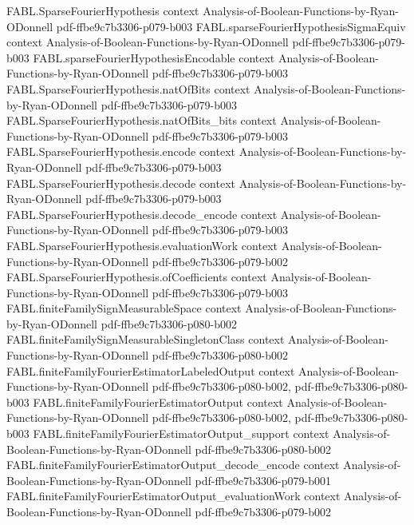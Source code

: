 \begin{theorem}
  {FABL.SparseFourierHypothesis}
  {context}
  {Analysis-of-Boolean-Functions-by-Ryan-ODonnell}
  {pdf-ffbe9c7b3306-p079-b003}
\proofstep
  {FABL.sparseFourierHypothesisSigmaEquiv}
  {context}
  {Analysis-of-Boolean-Functions-by-Ryan-ODonnell}
  {pdf-ffbe9c7b3306-p079-b003}
\proofstep
  {FABL.sparseFourierHypothesisEncodable}
  {context}
  {Analysis-of-Boolean-Functions-by-Ryan-ODonnell}
  {pdf-ffbe9c7b3306-p079-b003}
\proofstep
  {FABL.SparseFourierHypothesis.natOfBits}
  {context}
  {Analysis-of-Boolean-Functions-by-Ryan-ODonnell}
  {pdf-ffbe9c7b3306-p079-b003}
\proofstep
  {FABL.SparseFourierHypothesis.natOfBits_bits}
  {context}
  {Analysis-of-Boolean-Functions-by-Ryan-ODonnell}
  {pdf-ffbe9c7b3306-p079-b003}
\proofstep
  {FABL.SparseFourierHypothesis.encode}
  {context}
  {Analysis-of-Boolean-Functions-by-Ryan-ODonnell}
  {pdf-ffbe9c7b3306-p079-b003}
\proofstep
  {FABL.SparseFourierHypothesis.decode}
  {context}
  {Analysis-of-Boolean-Functions-by-Ryan-ODonnell}
  {pdf-ffbe9c7b3306-p079-b003}
\proofstep
  {FABL.SparseFourierHypothesis.decode_encode}
  {context}
  {Analysis-of-Boolean-Functions-by-Ryan-ODonnell}
  {pdf-ffbe9c7b3306-p079-b003}
\proofstep
  {FABL.SparseFourierHypothesis.evaluationWork}
  {context}
  {Analysis-of-Boolean-Functions-by-Ryan-ODonnell}
  {pdf-ffbe9c7b3306-p079-b002}
\proofstep
  {FABL.SparseFourierHypothesis.ofCoefficients}
  {context}
  {Analysis-of-Boolean-Functions-by-Ryan-ODonnell}
  {pdf-ffbe9c7b3306-p079-b003}
\proofstep
  {FABL.finiteFamilySignMeasurableSpace}
  {context}
  {Analysis-of-Boolean-Functions-by-Ryan-ODonnell}
  {pdf-ffbe9c7b3306-p080-b002}
\proofstep
  {FABL.finiteFamilySignMeasurableSingletonClass}
  {context}
  {Analysis-of-Boolean-Functions-by-Ryan-ODonnell}
  {pdf-ffbe9c7b3306-p080-b002}
\proofstep
  {FABL.finiteFamilyFourierEstimatorLabeledOutput}
  {context}
  {Analysis-of-Boolean-Functions-by-Ryan-ODonnell}
  {pdf-ffbe9c7b3306-p080-b002,
    pdf-ffbe9c7b3306-p080-b003}
\proofstep
  {FABL.finiteFamilyFourierEstimatorOutput}
  {context}
  {Analysis-of-Boolean-Functions-by-Ryan-ODonnell}
  {pdf-ffbe9c7b3306-p080-b002,
    pdf-ffbe9c7b3306-p080-b003}
\proofstep
  {FABL.finiteFamilyFourierEstimatorOutput_support}
  {context}
  {Analysis-of-Boolean-Functions-by-Ryan-ODonnell}
  {pdf-ffbe9c7b3306-p080-b002}
\proofstep
  {FABL.finiteFamilyFourierEstimatorOutput_decode_encode}
  {context}
  {Analysis-of-Boolean-Functions-by-Ryan-ODonnell}
  {pdf-ffbe9c7b3306-p079-b001}
\proofstep
  {FABL.finiteFamilyFourierEstimatorOutput_evaluationWork}
  {context}
  {Analysis-of-Boolean-Functions-by-Ryan-ODonnell}
  {pdf-ffbe9c7b3306-p079-b002}

\end{theorem}
